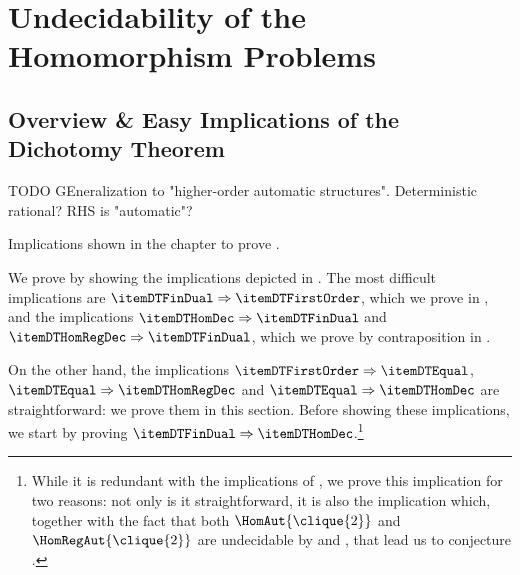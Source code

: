 \section{Undecidability of the Homomorphism Problems}
\label{sec:dichotomy-undecidability}

\subsection{Overview \& Easy Implications of the Dichotomy Theorem}
\label{sec:dichotomy-overview}

\begin{mainstatement}
	\DichotomyThmDichotomyAutomatic
\end{mainstatement}

\begin{remark}
	TODO GEneralization to "higher-order automatic structures".
	Deterministic rational?
	RHS is "automatic"?
\end{remark}

\begin{marginfigure}
	\centering
	\begin{tikzpicture}
		
	\end{tikzpicture}
	\caption{\AP\label{fig:dichotomy-overview}Implications shown in the chapter to prove
	.}
\end{marginfigure}
We prove  by showing the
implications depicted in .
The most difficult implications are $\itemDTFinDual \Rightarrow \itemDTFirstOrder$,
which we prove in , and the implications
$\itemDTHomDec \Rightarrow \itemDTFinDual$ and $\itemDTHomRegDec \Rightarrow \itemDTFinDual$,
which we prove by contraposition in .

On the other hand, the implications $\itemDTFirstOrder \Rightarrow \itemDTEqual$,
$\itemDTEqual \Rightarrow \itemDTHomRegDec$ and $\itemDTEqual \Rightarrow \itemDTHomDec$ are straightforward: we prove them in this section. 
Before showing these implications, we start by proving $\itemDTFinDual \Rightarrow \itemDTHomDec$.\footnote{While it is redundant with the implications of , 
we prove this implication for two reasons: not only is it straightforward, it is also
the implication which, together with the fact that both $\HomAut{\clique{2}}$
and $\HomRegAut{\clique{2}}$ are undecidable by
\cite[Proposition 6.5]{Kocher2014AutomatischenGraphen}
and \cite[Theorem 4.4]{BarceloFigueiraMorvan2023SeparatingAutomatic}, that lead us to conjecture
.}


